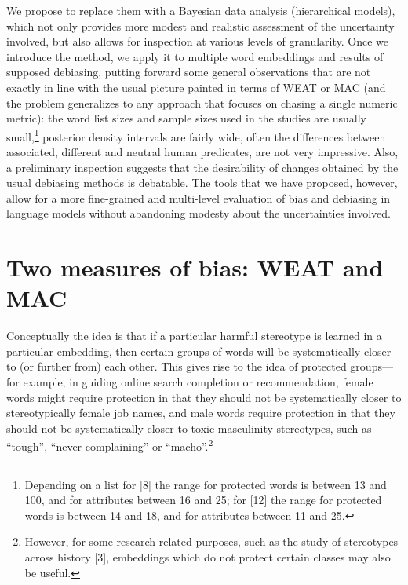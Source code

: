 \documentclass[
  12pt,
  dvipsnames,enabledeprecatedfontcommands]{scrartcl}
\begin{document}
We propose to replace them with a Bayesian data analysis (hierarchical
models), which not only provides more modest and realistic assessment of
the uncertainty involved, but also allows for inspection at various
levels of granularity. Once we introduce the method, we apply it to
multiple word embeddings and results of supposed debiasing, putting
forward some general observations that are not exactly in line with the
usual picture painted in terms of \textsf{WEAT} or \textsf{MAC} (and the
problem generalizes to any approach that focuses on chasing a single
numeric metric): the word list sizes and sample sizes used in the
studies are usually small,\footnote{Depending on a list for {[}8{]} the
  range for protected words is between 13 and 100, and for attributes
  between 16 and 25; for {[}12{]} the range for protected words is
  between 14 and 18, and for attributes between 11 and 25.} posterior
density intervals are fairly wide, often the differences between
associated, different and neutral human predicates, are not very
impressive. Also, a preliminary inspection suggests that the
desirability of changes obtained by the usual debiasing methods is
debatable. The tools that we have proposed, however, allow for a more
fine-grained and multi-level evaluation of bias and debiasing in
language models without abandoning modesty about the uncertainties
involved.

\hypertarget{two-measures-of-bias-weat-and-mac}{%
\section{Two measures of bias: WEAT and
MAC}\label{two-measures-of-bias-weat-and-mac}}

Conceptually the idea is that if a particular harmful stereotype is
learned in a particular embedding, then certain groups of words will be
systematically closer to (or further from) each other. This gives rise
to the idea of protected groups---for example, in guiding online search
completion or recommendation, female words might require protection in
that they should not be systematically closer to stereotypically female
job names, and male words require protection in that they should not be
systematically closer to toxic masculinity stereotypes, such as
``tough'', ``never complaining'' or ``macho''.\footnote{However, for
  some research-related purposes, such as the study of stereotypes
  across history {[}3{]}, embeddings which do not protect certain
  classes may also be useful.}
\end{document}
